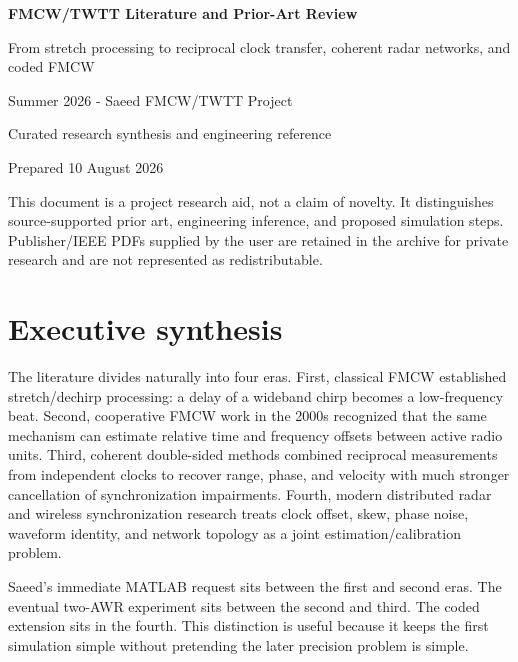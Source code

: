 \documentclass[11pt]{article}
\begin{document}
\begin{titlepage}
\centering
\vspace*{1.2in}
{\Huge\bfseries\color{navy} FMCW/TWTT Literature and Prior-Art Review\par}
\vspace{0.3in}
{\Large From stretch processing to reciprocal clock transfer, coherent radar networks, and coded FMCW\par}
\vspace{0.6in}
{\large Summer 2026 - Saeed FMCW/TWTT Project\par}
\vfill
{\large Curated research synthesis and engineering reference\par}
{\large Prepared 10 August 2026\par}
\vspace{0.4in}
\begin{minipage}{0.82\textwidth}
\small
This document is a project research aid, not a claim of novelty. It distinguishes source-supported prior art, engineering inference, and proposed simulation steps. Publisher/IEEE PDFs supplied by the user are retained in the archive for private research and are not represented as redistributable.
\end{minipage}
\end{titlepage}
\tableofcontents
\clearpage

\section{Executive synthesis}
The literature divides naturally into four eras. First, classical FMCW established stretch/dechirp processing: a delay of a wideband chirp becomes a low-frequency beat. Second, cooperative FMCW work in the 2000s recognized that the same mechanism can estimate relative time and frequency offsets between active radio units. Third, coherent double-sided methods combined reciprocal measurements from independent clocks to recover range, phase, and velocity with much stronger cancellation of synchronization impairments. Fourth, modern distributed radar and wireless synchronization research treats clock offset, skew, phase noise, waveform identity, and network topology as a joint estimation/calibration problem.

Saeed's immediate MATLAB request sits between the first and second eras. The eventual two-AWR experiment sits between the second and third. The coded extension sits in the fourth. This distinction is useful because it keeps the first simulation simple without pretending the later precision problem is simple.
\end{document}
